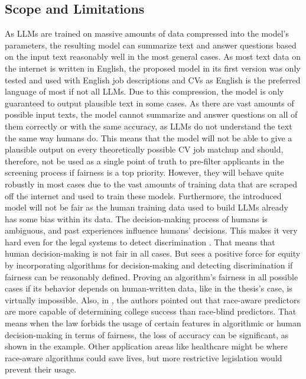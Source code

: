\documentclass[draft,final]{thesisclass} %
\begin{document}
\subsection{Scope and Limitations}
As \acs{LLM}s are trained on massive amounts of data compressed into the model's parameters, the resulting model can summarize text and answer questions based on the input text reasonably well in the most general cases.
As most text data on the internet is written in English, the proposed model in its first version was only tested and used with English job descriptions and \acs{CV}s as English is the preferred language of most if not all \acs{LLM}s.
Due to this compression, the model is only guaranteed to output plausible text in some cases. 
As there are vast amounts of possible input texts, the model cannot summarize and answer questions on all of them correctly or with the same accuracy, as \acs{LLM}s do not understand the text the same way humans do.
This means that the model will not be able to give a plausible output on every theoretically possible \acs{CV} job matchup and should, therefore, not be used as a single point of truth to pre-filter applicants in the screening process if fairness is a top priority.
However, they will behave quite robustly in most cases due to the vast amounts of training data that are scraped off the internet and used to train these models.
Furthermore, the introduced model will not be fair as the human training data used to build \acs{LLM}s already has some bias within its data. The decision-making process of humans is ambiguous, and past experiences influence humans' decisions. This makes it very hard even for the legal systems to detect discrimination \parencite[113]{discrimination_algorithms}. That means that human decision-making is not fair in all cases. But \textcite[113]{discrimination_algorithms} sees a positive force for equity by incorporating algorithms for decision-making and detecting discrimination if fairness can be reasonably defined. Proving an algorithm's fairness in all possible cases if its behavior depends on human-written data, like in the thesis's case, is virtually impossible. Also, in \textcite[158-160]{discrimination_algorithms}, the authors pointed out that race-aware predictors are more capable of determining college success than race-blind predictors.
That means when the law forbids the usage of certain features in algorithmic or human decision-making in terms of fairness, the loss of accuracy can be significant, as shown in the example. Other application areas like healthcare might be where race-aware algorithms could save lives, but more restrictive legislation would prevent their usage.
\end{document}
